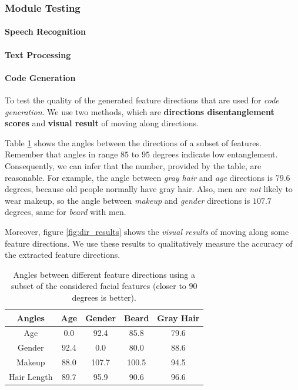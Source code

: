 \subsubsection{Module Testing}

\paragraph{Speech Recognition}

\paragraph{Text Processing}

\paragraph{Code Generation}
To test the quality of the generated feature directions that are used for \emph{code generation}. We use two methods, which are \textbf{directions disentanglement scores} and \textbf{visual result} of moving along directions.

Table \ref{tab:angles} shows the angles between the directions of a subset of features. Remember that angles in range $85$ to $95$ degrees indicate low entanglement. Consequently, we can infer that the number, provided by the table, are reasonable. For example, the angle between \emph{gray hair} and \emph{age} directions is $79.6$ degrees, because old people normally have gray hair. Also, men are \emph{not} likely to wear makeup, so the angle between \emph{makeup} and \emph{gender} directions is $107.7$ degrees, same for \emph{beard} with men.

Moreover, figure \ref{fig:dir_results} shows the \emph{visual results} of moving along some feature directions. We use these results to qualitatively measure the accuracy of the extracted feature directions.

\begin{table}[ht]
\centering
\begin{tabular}[t]{| c | c | c | c | c |}
\hline
\textbf{Angles} & Age & Gender & Beard & Gray Hair \\
\hline
Age & 0.0 & 92.4 & 85.8 & 79.6 \\
\hline
Gender & 92.4 & 0.0 & 80.0 & 88.6 \\
\hline
Makeup & 88.0 & 107.7 & 100.5 & 94.5 \\
\hline
Hair Length & 89.7 & 95.9 & 90.6 & 96.6 \\
\hline
\end{tabular}
\caption{Angles between different feature directions using a subset of the considered facial features (closer to $90$ degrees is better).}
\label{tab:angles}
\end{table}

